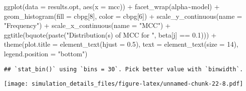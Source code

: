 \documentclass[
]{article}
\newenvironment{Shaded}{\begin{snugshade}}{\end{snugshade}}
\newcommand{\AttributeTok}[1]{\textcolor[rgb]{0.77,0.63,0.00}{#1}}
\newcommand{\DecValTok}[1]{\textcolor[rgb]{0.00,0.00,0.81}{#1}}
\newcommand{\FloatTok}[1]{\textcolor[rgb]{0.00,0.00,0.81}{#1}}
\newcommand{\FunctionTok}[1]{\textcolor[rgb]{0.00,0.00,0.00}{#1}}
\newcommand{\NormalTok}[1]{#1}
\newcommand{\SpecialCharTok}[1]{\textcolor[rgb]{0.00,0.00,0.00}{#1}}
\newcommand{\StringTok}[1]{\textcolor[rgb]{0.31,0.60,0.02}{#1}}
\begin{document}
\begin{Shaded}
\begin{Highlighting}[]
\FunctionTok{ggplot}\NormalTok{(}\AttributeTok{data =}\NormalTok{ results.opt,}
       \FunctionTok{aes}\NormalTok{(}\AttributeTok{x =}\NormalTok{ mcc)) }\SpecialCharTok{+}
  \FunctionTok{facet\_wrap}\NormalTok{(alpha}\SpecialCharTok{\textasciitilde{}}\NormalTok{model) }\SpecialCharTok{+}
  \FunctionTok{geom\_histogram}\NormalTok{(}\AttributeTok{fill =}\NormalTok{ cbpg[}\DecValTok{8}\NormalTok{], }\AttributeTok{color =}\NormalTok{ cbpg[}\DecValTok{6}\NormalTok{]) }\SpecialCharTok{+}
  \FunctionTok{scale\_y\_continuous}\NormalTok{(}\AttributeTok{name =} \StringTok{"Frequency"}\NormalTok{) }\SpecialCharTok{+}
  \FunctionTok{scale\_x\_continuous}\NormalTok{(}\AttributeTok{name =} \StringTok{"MCC"}\NormalTok{) }\SpecialCharTok{+}
  \FunctionTok{ggtitle}\NormalTok{(}\FunctionTok{bquote}\NormalTok{(}\FunctionTok{paste}\NormalTok{(}\StringTok{"Distribution(s) of MCC for "}\NormalTok{, beta[j] }\SpecialCharTok{==} \FloatTok{0.1}\NormalTok{))) }\SpecialCharTok{+}
  \FunctionTok{theme}\NormalTok{(}\AttributeTok{plot.title =} \FunctionTok{element\_text}\NormalTok{(}\AttributeTok{hjust =} \FloatTok{0.5}\NormalTok{), }
        \AttributeTok{text =} \FunctionTok{element\_text}\NormalTok{(}\AttributeTok{size =} \DecValTok{14}\NormalTok{),}
        \AttributeTok{legend.position =} \StringTok{"bottom"}\NormalTok{)}
\end{Highlighting}
\end{Shaded}

\begin{verbatim}
## `stat_bin()` using `bins = 30`. Pick better value with `binwidth`.
\end{verbatim}

\texttt{[image: simulation\_details\_files/figure-latex/unnamed-chunk-22-8.pdf]}
\end{document}
